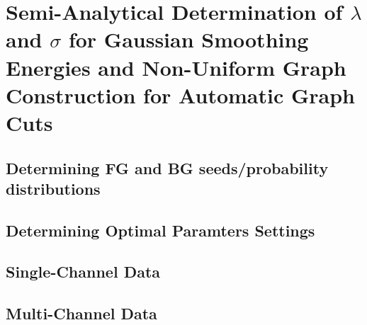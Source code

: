 
\chapter{Semi-Analytical Determination of $\lambda$ and $\sigma$ for Gaussian Smoothing Energies and Non-Uniform Graph Construction for Automatic Graph Cuts} %

\label{chap:Chapter5} %


\section{Determining FG and BG seeds/probability distributions}



\section{Determining Optimal Paramters Settings}



\section{Single-Channel Data}



\section{Multi-Channel Data}
